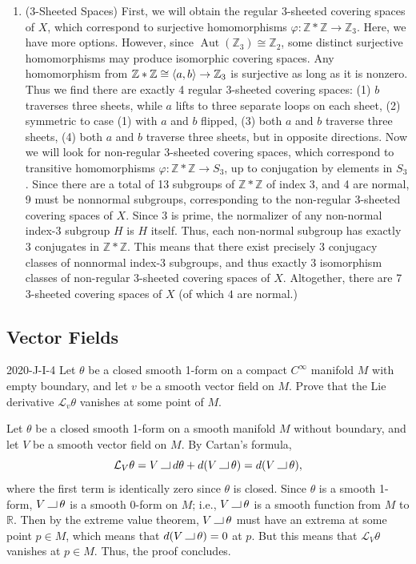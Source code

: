 \documentclass{article}
\newcommand{\contract}{\mathbin{\vrule height 0.4pt width 8pt depth 0pt\vrule height 6pt width 0.4pt depth 0pt}}
\begin{document}
\begin{enumerate}[itemsep =-2pt, label = (\roman{*})]
		\item (3-Sheeted Spaces) First, we will obtain the regular 3-sheeted covering spaces of $X$, which correspond to surjective homomorphisms $\varphi: \mathbb{Z} \ast \mathbb{Z} \to \mathbb{Z}_{3}$. Here, we have more options. However, since $\operatorname{Aut}(\mathbb{Z}_{3}) \cong \mathbb{Z}_{2}$, some distinct surjective homomorphisms may produce isomorphic covering spaces. Any homomorphism from $\mathbb{Z} \ast \mathbb{Z} \cong \braket{a,b} \to \mathbb{Z}_{3}$ is surjective as long as it is nonzero. Thus we find there are exactly 4 regular 3-sheeted covering spaces: (1) $b$ traverses three sheets, while $a$ lifts to three separate loops on each sheet, (2) symmetric to case (1) with $a$ and $b$ flipped, (3) both $a$ and $b$ traverse three sheets, (4) both $a$ and $b$ traverse three sheets, but in opposite directions. Now we will look for non-regular 3-sheeted covering spaces, which correspond to transitive homomorphisms $\varphi: \mathbb{Z} \ast \mathbb{Z} \to S_{3}$, up to conjugation by elements in $S_{3}$. Since there are a total of 13 subgroups of $\mathbb{Z}\ast \mathbb{Z}$ of index 3, and 4 are normal, 9 must be nonnormal subgroups, corresponding to the non-regular 3-sheeted covering spaces of $X$. Since $3$ is prime, the normalizer of any non-normal index-3 subgroup $H$ is $H$ itself. Thus, each non-normal subgroup has exactly $3$ conjugates in $\mathbb{Z} \ast \mathbb{Z}$. This means that there exist precisely 3 conjugacy classes of nonnormal index-3 subgroups, and thus exactly 3 isomorphism classes of non-regular 3-sheeted covering spaces of $X$. Altogether, there are 7 3-sheeted covering spaces of $X$ (of which $4$ are normal.)
	\end{enumerate}
	
	\newpage 
	\subsection{Vector Fields}
	\begin{prb}{2020-J-I-4}
		Let $\theta$ be a closed smooth 1-form on a compact $C^{\infty}$ manifold $M$ with empty boundary, and let $v$ be a smooth vector field on $M$. Prove that the Lie derivative $\mathcal{L}_{v}\theta$ vanishes at some point of $M$. 
	\end{prb}
	Let $\theta$ be a closed smooth 1-form on a smooth manifold $M$ without boundary, and let $V$ be a smooth vector field on $M$. By Cartan's formula, 
	\begin{equation*}
		\mathcal{L}_{V}\theta = V \contract d\theta + d(V \contract \theta) = d(V \contract \theta), 
	\end{equation*}
	where the first term is identically zero since $\theta$ is closed. Since $\theta$ is a smooth 1-form, $V \contract \theta$ is a smooth 0-form on $M$; i.e., $V \contract \theta$ is a smooth function from $M$ to $\mathbb{R}$. Then by the extreme value theorem, $V \contract \theta$ must have an extrema at some point $p \in M$, which means that $d(V \contract \theta) = 0$ at $p$. But this means that $\mathcal{L}_{V}\theta$ vanishes at $p \in M$. Thus, the proof concludes. 
	
\end{document}

